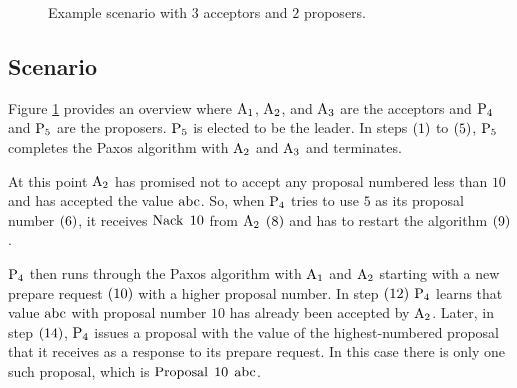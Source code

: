 \begin{figure}
\begin{center}
\end{center}
\caption{Example scenario with $3$ acceptors and $2$ proposers.}
\label{fig:scenario}
\end{figure}

\subsection{Scenario}
Figure \ref{fig:scenario} provides an overview where $\operatorname{A_{1}}$, $\operatorname{A_{2}}$, and $\operatorname{A_{3}}$ are the acceptors and $\operatorname{P_{4}}$ and $\operatorname{P_{5}}$ are the proposers.
$\operatorname{P_{5}}$ is elected to be the leader.
In steps $\left(1\right)$ to $\left(5\right)$, $\operatorname{P_{5}}$ completes the Paxos algorithm with $\operatorname{A_{2}}$ and $\operatorname{A_{3}}$ and terminates.

At this point $\operatorname{A_{2}}$ has promised not to accept any proposal numbered less than $10$ and has accepted the value $\operatorname{abc}$.
So, when $\operatorname{P_{4}}$ tries to use $5$ as its proposal number $\left(6\right)$, it receives $\operatorname{Nack}\; 10$ from $\operatorname{A_{2}}$ $\left(8\right)$ and has to restart the algorithm $\left(9\right)$.

$\operatorname{P_{4}}$ then runs through the Paxos algorithm with $\operatorname{A_{1}}$ and $\operatorname{A_{2}}$ starting with a new prepare request $\left(10\right)$ with a higher proposal number.
In step $\left(12\right)$ $\operatorname{P_{4}}$ learns that value $\operatorname{abc}$ with proposal number $10$ has already been accepted by $\operatorname{A_{2}}$.
Later, in step $\left(14\right)$, $\operatorname{P_{4}}$ issues a proposal with the value of the highest-numbered proposal that it receives as a response to its prepare request.
In this case there is only one such proposal, which is $\operatorname{Proposal}\; 10\; \operatorname{abc}$.

